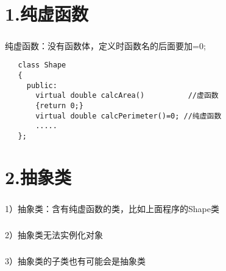 \documentclass{article}
\begin{document}
\begin{CJK}{UTF8}{gbsn}
\section*{1.纯虚函数}
\subparagraph*{}
纯虚函数：没有函数体，定义时函数名的后面要加=0;
\begin{verbatim}
   class Shape
   {
     public:
       virtual double calcArea()          //虚函数
       {return 0;}
       virtual double calcPerimeter()=0; //纯虚函数
       .....
   };
\end{verbatim}
\section*{2.抽象类}
\subparagraph*{}
1）抽象类：含有纯虚函数的类，比如上面程序的Shape类
\subparagraph*{}
2）抽象类无法实例化对象
\subparagraph*{}
3）抽象类的子类也有可能会是抽象类
\end{CJK}
\end{document}
